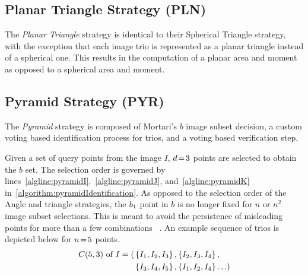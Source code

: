 
\subsection{Planar Triangle Strategy (PLN)}\label{subsec:coleAndCrassidus'sPlanarTriangleMethod}
The \textit{Planar Triangle} strategy is identical to their Spherical Triangle strategy, with the exception that each
image trio is represented as a planar triangle instead of a spherical one.
This results in the computation of a planar area and moment as opposed to a spherical area and moment.

\subsection{Pyramid Strategy (PYR)}\label{subsec:pyramidMethod}
The \textit{Pyramid} strategy is composed of Mortari's $b$ image subset decision, a custom voting based identification
process for trios, and a voting based verification step.

Given a set of query points from the image $I$, $d \!=\! 3$ points are selected to obtain the $b$ set.
The selection order is governed by lines~\ref{algline:pyramidI},~\ref{algline:pyramidJ}, and~\ref{algline:pyramidK}
in~\autoref{algorithm:pyramidIdentification}.
As opposed to the selection order of the Angle and triangle strategies, the $b_1$ point in $b$ is no longer fixed
for $n$ or $n^2$ image subset selections.
This is meant to avoid the persistence of misleading points for more than a few combinations
~\cite{mortari:pyramidIdentification}.
An example sequence of trios is depicted below for $n \!=\! 5$ points.
\begin{equation}
    \begin{aligned}
        C(5, 3) \text{ of } I = ( &\left\{ I_1, I_2, I_3 \right\}, \left\{ I_2, I_3, I_4 \right\}, \\
        &\left\{ I_3, I_4, I_5 \right\}, \left\{ I_1, I_2, I_4  \right\}\ldots )
    \end{aligned}
\end{equation}

